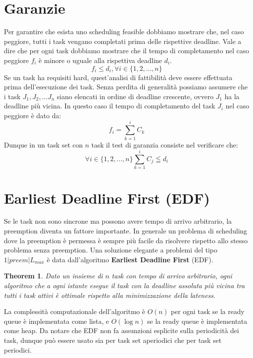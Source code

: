 \documentclass[12pt,openany,onesided]{book}
\newtheorem{theorem}{Theorem}
\begin{document}
\section{Garanzie}
Per garantire che esista uno scheduling feasible dobbiamo mostrare che, nel caso peggiore, tutti i task vengano completati prima delle rispettive deadline.
Vale a dire che per ogni task dobbiamo mostrare che il tempo di completamento nel caso peggiore $f_i$ è minore o uguale alla rispettiva deadline $d_i$.
\begin{equation}
    f_i \leq d_i , \forall i \in \{1,2,\ldots,n\}
\end{equation}
Se un task ha requisiti hard, quest'analisi di fattibilità deve essere effettuata prima dell'esecuzione dei task.
Senza perdita di generalità possiamo assumere che i task $J_1,J_2,\dots J_n$ siano elencati in ordine di deadline crescente, ovvero $J_1$ ha la deadline più vicina.
In questo caso il tempo di completamento del task $J_i$ nel caso peggiore è dato da:
\begin{equation}
    f_i=\sum_{k=1}^{i} C_k
\end{equation}
Dunque in un task set con $n$ task il test di garanzia consiste nel verificare che:
\begin{equation}
    \forall i \in \{1,2,\dots ,n\} \sum_{k=1}^i C_j \leqq d_i
\end{equation}
\section{Earliest Deadline First (EDF)}
Se le task non sono sincrone ma possono avere tempo di arrivo arbitrario, la preemption diventa un fattore importante.
In generale un problema di scheduling dove la preemption è permessa è sempre più facile da risolvere rispetto allo stesso problema senza preemption.
Una soluzione elegante a problemi del tipo $1|preem|L_{max}$ è data dall'algoritmo \textbf{Earliest Deadline First} (EDF).
\begin{theorem}
    Dato un insieme di $n$ task con tempo di arrivo arbitrario, ogni algoritmo che a ogni istante esegue il task con la deadline assoluta più vicina tra tutti i task attivi è ottimale rispetto alla minimizzazione della lateness.
\end{theorem}
La complessità computazionale dell'algoritmo è $O(n)$ per ogni task se la ready queue è implementata come lista, e $O(\log n)$ se la ready queue è implementata come heap.
Da notare che EDF non fa assunzioni esplicite sulla periodicità dei task, dunque può essere usato sia per task set aperiodici che per task set periodici.
\end{document}
